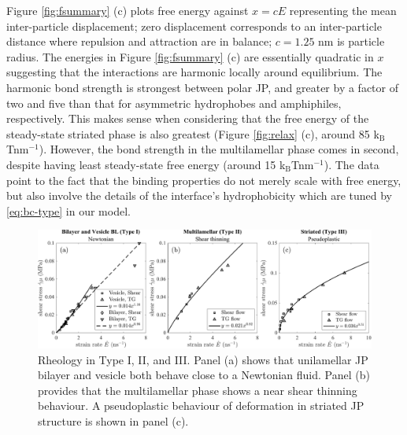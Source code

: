 \documentclass[prb,preprint,showpacs,preprintnumbers,amsmath,amssymb,longbibliography]{revtex4-1}
\newcommand{\KBT}{k$_{\text{B}}$T}
\begin{document}
Figure \ref{fig:fsummary} (c) plots free energy 
against $x = c E$ representing the mean  
inter-particle displacement;    
zero displacement corresponds
to an inter-particle distance where 
repulsion and attraction are in balance;
$c = 1.25$ nm is particle radius.
The energies in Figure \ref{fig:fsummary} (c) are essentially  
quadratic in $x$ suggesting that the interactions 
are harmonic locally around equilibrium.
The harmonic bond strength is strongest between 
polar JP, and greater by a factor of two and five than
that for asymmetric hydrophobes and amphiphiles,
respectively.  This makes sense when considering 
that the free energy of the steady-state striated
phase is also greatest (Figure \ref{fig:relax} (c), around 85 \KBT\;nm$^{-1}$).
However, the bond strength in the multilamellar 
phase comes in second, despite having least steady-state free energy
(around 15 \KBT\;nm$^{-1}$).
The data point to the fact that the binding properties 
do not merely scale with free energy, 
but also involve the details of the interface's
hydrophobicity 
which are tuned by \ref{eq:bc-type} in our model.

\begin{figure}[t]
\begin{center}
\includegraphics[width=\textwidth]{RheologySummary.pdf}
\end{center}
\caption{\label{fig:rheologysummary}
Rheology in Type I, II, and III. Panel (a) shows that unilamellar JP bilayer and vesicle both behave close to a Newtonian fluid. Panel (b) provides that the multilamellar phase shows a near shear thinning behaviour. A pseudoplastic behaviour of deformation in striated JP structure is shown in panel (c). }
\end{figure}
\end{document}
